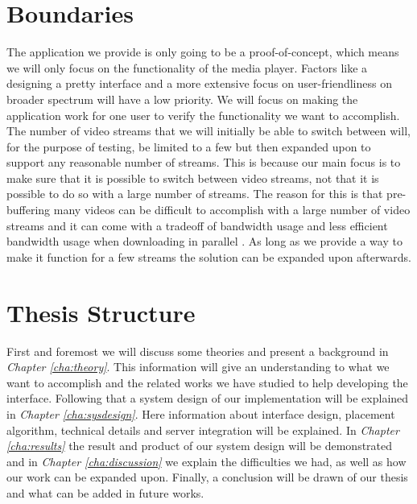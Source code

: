 \section{Boundaries}
\label{sec:boundaries}

The application we provide is only going to be a proof-of-concept, which means we will only focus on the functionality of the media player. Factors like a designing a pretty interface and a more extensive focus on user-friendliness on broader spectrum will have a low priority. We will focus on making the application work for one user to verify the functionality we want to accomplish. The number of video streams that we will initially be able to switch between will, for the purpose of testing, be limited to a few but then expanded upon to support any reasonable number of streams. This is because our main focus is to make sure that it is possible to switch between video streams, not that it is possible to do so with a large number of streams. The reason for this is that pre-buffering many videos can be difficult to accomplish with a large number of video streams and it can come with a tradeoff of bandwidth usage and less efficient bandwidth usage when downloading in parallel \cite{watchingprefetching, scalableOnDemand}. As long as we provide a way to make it function for a few streams the solution can be expanded upon afterwards.

\section{Thesis Structure}
First and foremost we will discuss some theories and present a background in \textit{Chapter \ref{cha:theory}}. This information will give an understanding to what we want to accomplish and the related works we have studied to help developing the interface. Following that a system design of our implementation will be explained in \textit{Chapter \ref{cha:sysdesign}}. Here information about interface design, placement algorithm, technical details and server integration will be explained. In \textit{Chapter \ref{cha:results}} the result and product of our system design will be demonstrated and in \textit{Chapter \ref{cha:discussion}} we explain the difficulties we had, as well as how our work can be expanded upon. Finally, a conclusion will be drawn of our thesis and what can be added in future works.

